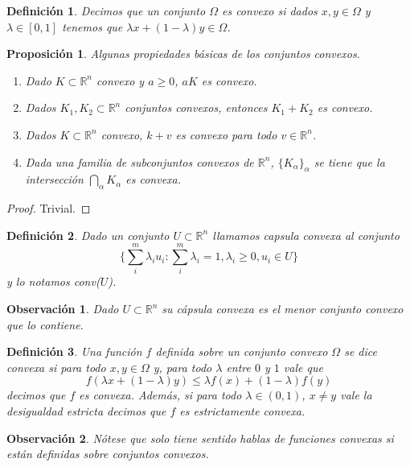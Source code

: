 \documentclass[11pt]{article}
\theoremstyle{ejstyle}
\theoremstyle{ejstyle}
\newtheorem{definicion}{Definición}
\theoremstyle{ejstyle}
\newtheorem{obs}{Observación}
\theoremstyle{ejstyle}
\theoremstyle{ejstyle}
\newtheorem{prop}{Proposición}
\theoremstyle{ejstyle}
\theoremstyle{ejstyle}
\begin{document}
 	\begin{definicion}
 		Decimos que un conjunto $\Omega$ es convexo si dados $x, y \in \Omega$ y $\lambda \in [0, 1]$ tenemos que $\lambda x + (1 - \lambda)y \in \Omega$.
 	\end{definicion}	
 	
 	\begin{prop} 
 		Algunas propiedades básicas de los conjuntos convexos.
		\begin{enumerate}
			\item Dado $K \subset \mathbb{R}^n$ convexo y $a \geq 0$, $aK$ es convexo.
			\item Dados $K_1, K_2 \subset \mathbb{R}^n$ conjuntos convexos, entonces $K_1 + K_2$ es convexo.
			\item Dados $K \subset \mathbb{R}^n$ convexo, $k + v$ es convexo para todo $v \in \mathbb{R}^{n}$. 
			\item Dada una familia de subconjuntos convexos de $\mathbb{R}^n $, $\{ K_\alpha \}_\alpha$ se tiene que la intersección $\bigcap_{\alpha} K_\alpha$ es convexa.
		\end{enumerate} 		
 	\end{prop}
 	
 	\begin{proof}
 		Trivial.
 	\end{proof}
 		
 	\begin{definicion}
 		Dado un conjunto $U \subset \mathbb{R}^{n}$ llamamos capsula convexa al conjunto
 		$$
 		\{\sum_{i}^{m} \lambda_i u_i : \sum_{i}^{m} \lambda_i = 1, \lambda_i \geq 0, u_i \in U \}
 		$$
 		y lo notamos conv($U$).
 	\end{definicion}	
 	
 	\begin{obs}
 		Dado $U \subset \mathbb{R}^{n}$ su cápsula convexa es el menor conjunto convexo que lo contiene. 
 	\end{obs}
 	
	\begin{definicion}
		Una función $f$ definida sobre un conjunto convexo $\Omega$ se dice convexa si para todo $x, y \in \Omega$ y, para todo $\lambda$ entre $0$ y $1$ vale que
		$$
		f(\lambda x + (1- \lambda) y) \leq \lambda f(x) + (1-\lambda) f(y)
		$$
		decimos que $f$ es convexa. Además, si para todo $\lambda \in (0, 1)$, $x \neq y$ vale la desigualdad estricta decimos que $f$ es estrictamente convexa.
	\end{definicion}
	
	\begin{obs}
		Nótese que solo tiene sentido hablas de funciones convexas si están definidas sobre conjuntos convexos.
	\end{obs}
	
\end{document}
